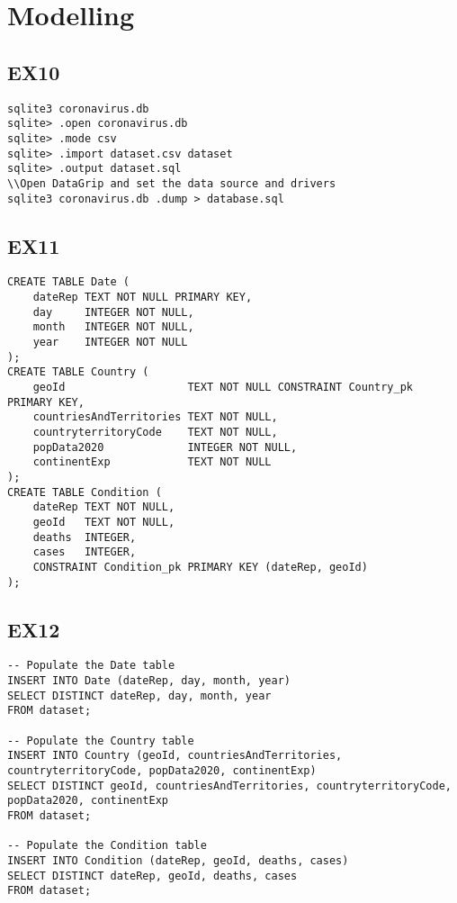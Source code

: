 \documentclass{article}
\begin{document}
\section{Modelling}
\subsection*{EX10}
\begin{verbatim}
sqlite3 coronavirus.db 
sqlite> .open coronavirus.db
sqlite> .mode csv
sqlite> .import dataset.csv dataset
sqlite> .output dataset.sql
\\Open DataGrip and set the data source and drivers
sqlite3 coronavirus.db .dump > database.sql
\end{verbatim}
\newpage

\subsection*{EX11}
\begin{verbatim}
CREATE TABLE Date (
    dateRep TEXT NOT NULL PRIMARY KEY,
    day     INTEGER NOT NULL,
    month   INTEGER NOT NULL,
    year    INTEGER NOT NULL
);
CREATE TABLE Country (
    geoId                   TEXT NOT NULL CONSTRAINT Country_pk PRIMARY KEY,
    countriesAndTerritories TEXT NOT NULL,
    countryterritoryCode    TEXT NOT NULL,
    popData2020             INTEGER NOT NULL,
    continentExp            TEXT NOT NULL
);
CREATE TABLE Condition (
    dateRep TEXT NOT NULL,
    geoId   TEXT NOT NULL,
    deaths  INTEGER,
    cases   INTEGER,
    CONSTRAINT Condition_pk PRIMARY KEY (dateRep, geoId)
);
\end{verbatim}

\subsection*{EX12}
\begin{verbatim}
-- Populate the Date table
INSERT INTO Date (dateRep, day, month, year)
SELECT DISTINCT dateRep, day, month, year
FROM dataset;

-- Populate the Country table
INSERT INTO Country (geoId, countriesAndTerritories, countryterritoryCode, popData2020, continentExp)
SELECT DISTINCT geoId, countriesAndTerritories, countryterritoryCode, popData2020, continentExp
FROM dataset;

-- Populate the Condition table
INSERT INTO Condition (dateRep, geoId, deaths, cases)
SELECT DISTINCT dateRep, geoId, deaths, cases
FROM dataset;
\end{verbatim}
\end{document}
